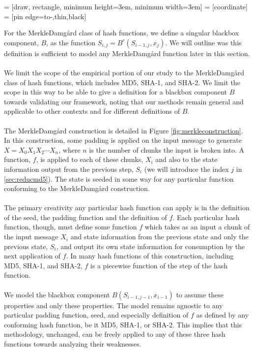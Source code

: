  = [draw, rectangle, minimum height=3em, minimum width=3em]
 = [coordinate]
 = [pin edge={to-,thin,black}]
\begin{center}
\end{center}

For the Merkle{\textendash}Damg\r{a}rd class of hash functions, we define a singular blackbox component, $B$, as the function $S_{i,j} =  B^r(S_{i-1,j}, x_{j})$. We will outline was this definition is sufficient to model any Merkle{\textendash}Damg\r{a}rd function later in this section. 
\\
\\
We limit the scope of the empirical portion of our study to the Merkle{\textendash}Damg\r{a}rd class of hash functions, which includes MD5, SHA-1, and SHA-2. We limit the scope in this way to be able to give a definition for a blackbox component $B$ towards validating our framework, noting that our methods remain general and applicable to other contexts and for different definitions of $B$. 
\\
\\
The Merkle{\textendash}Damg\r{a}rd construction is detailed in Figure \ref{fig:merkleconstruction}. In this construction, some padding is applied on the input message to generate $X = X_0X_1X_2\cdots X_n$, where $n$ is the number of chunks the input is broken into. A function, $f$, is applied to each of these chunks, $X_i$ and also to the state information output from the previous step, $S_i$ (we will introduce the index $j$ in \ref{sec:reducmd5}). The state is seeded in some way for any particular function conforming to the Merkle{\textendash}Damg\r{a}rd construction. 
\\
\\
The primary creativity any particular hash function can apply is in the definition of the seed, the padding function and the definition of $f$. Each particular hash function, though, must define some function $f$ which takes as an input a chunk of the input message $X_i$ and state information from the previous state and only the previous state, $S_i$, and output its own state information for consumption by the next application of $f$. In many hash functions of this construction, including MD5, SHA-1, and SHA-2, $f$ is a piecewise function of the step of the hash function.  
\\
\\
We model the blackbox component $B(S_{i-1,j-1}, x_{i-1})$ to assume these properties and only these properties. The model remains agnostic to any particular padding function, seed, and especially definition of $f$ as defined by any conforming hash function, be it MD5, SHA-1, or SHA-2. This implies that this methodology, unchanged, can be freely applied to any of these three hash functions towards analyzing their weaknesses. 

